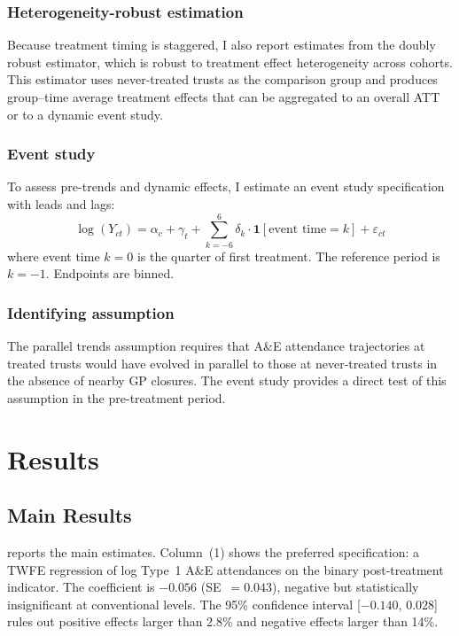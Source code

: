 \documentclass[12pt]{article}
\begin{document}
\subsubsection*{Heterogeneity-robust estimation} Because treatment timing is staggered, I also report estimates from the \citet{CS2021} doubly robust estimator, which is robust to treatment effect heterogeneity across cohorts. This estimator uses never-treated trusts as the comparison group and produces group--time average treatment effects that can be aggregated to an overall ATT or to a dynamic event study.

\subsubsection*{Event study} To assess pre-trends and dynamic effects, I estimate an event study specification with leads and lags:
\begin{equation}
\log(Y_{ct}) = \alpha_c + \gamma_t + \sum_{k=-6}^{6} \delta_k \cdot \mathbf{1}[\text{event time} = k] + \varepsilon_{ct}
\end{equation}
where event time $k = 0$ is the quarter of first treatment. The reference period is $k = -1$. Endpoints are binned.

\subsubsection*{Identifying assumption} The parallel trends assumption requires that A\&E attendance trajectories at treated trusts would have evolved in parallel to those at never-treated trusts in the absence of nearby GP closures. The event study provides a direct test of this assumption in the pre-treatment period.

\section{Results}
\label{sec:results}

\subsection{Main Results}

 reports the main estimates. Column~(1) shows the preferred specification: a TWFE regression of log Type~1 A\&E attendances on the binary post-treatment indicator. The coefficient is $-0.056$ (SE~$= 0.043$), negative but statistically insignificant at conventional levels. The 95\% confidence interval [$-0.140$, $0.028$] rules out positive effects larger than 2.8\% and negative effects larger than 14\%.
\end{document}
